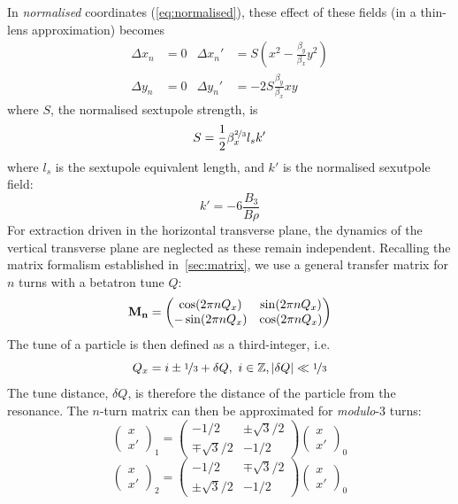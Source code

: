 \documentclass[a4paper,twoside,11pt]{report}
\begin{document}
In \textit{normalised} coordinates (\autoref{eq:normalised}), these effect of these fields (in a thin-lens approximation) becomes
\begin{align*}
  \Delta x_n&=0 & \Delta x_n'&=S(x^2-\frac{\beta_y}{\beta_x}y^2) \\
  \Delta y_n&=0 & \Delta y_n'&=-2S\frac{\beta_y}{\beta_x}xy
\end{align*}
where $S$, the normalised sextupole strength, is
\begin{equation}
  S=\frac 12\beta_x^{\nicefrac 23}l_sk'
  \label{eq:normalised_sextupole_strength}
\end{equation} where $l_s$ is the sextupole equivalent length, and $k'$ is the normalised sexutpole field:
\begin{equation}
  k'=-6\frac{B_3}{B\rho}
\end{equation}
For extraction driven in the horizontal transverse plane, the dynamics of the vertical transverse plane are neglected as these remain independent. Recalling the matrix formalism established in~\autoref{sec:matrix}, we use a general transfer matrix for $n$ turns with a betatron tune $Q$:
\begin{equation}
  \bf M_n=
  \begin{pmatrix}
    \cos(2\pi nQ_x)  & \sin(2\pi nQ_x) \\
    -\sin(2\pi nQ_x) & \cos(2\pi nQ_x)
  \end{pmatrix}
\end{equation}
The tune of a particle is then defined as a third-integer, i.e.
\begin{equation}
  Q_x=i\pm\nicefrac 13 +\delta Q,\ i\in\mathbb{Z}, |\delta Q|\ll\nicefrac 13
\end{equation} 
The tune distance, $\delta Q$, is therefore the distance of the particle from the resonance. The $n$-turn matrix can then be approximated for \textit{modulo}-3 turns:
\begin{equation}
  \begin{pmatrix}
    x\\x'
  \end{pmatrix}_1=
  \begin{pmatrix}
    -1/2 & \pm\sqrt{3}/2 \\
    \mp\sqrt{3}/2 & -1/2
  \end{pmatrix}\begin{pmatrix}
    x\\x'
  \end{pmatrix}_0
\end{equation}
\begin{equation}
  \begin{pmatrix}
    x\\x'
  \end{pmatrix}_2=
  \begin{pmatrix}
    -1/2 & \mp\sqrt{3}/2 \\
    \pm\sqrt{3}/2 & -1/2
  \end{pmatrix}\begin{pmatrix}
    x\\x'
  \end{pmatrix}_0
\end{equation}
\end{document}
